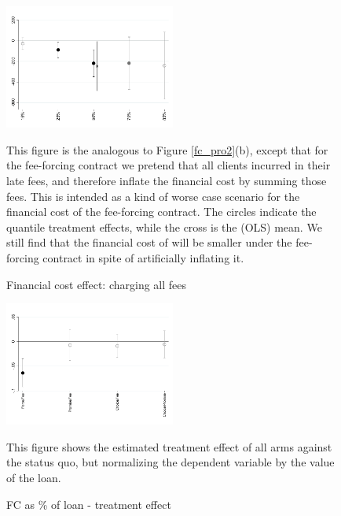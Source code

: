 \documentclass[oneside,11pt]{article}
\begin{document}
\begin{figure}[H]
        \caption{Financial cost effect: charging all fees}
    \label{fc_allfee}
    \begin{center}
        \centering
        \includegraphics[width=0.50\textwidth]{Figuras/fc_allfee_quantile_pro_2.pdf}
    \end{center}
    \scriptsize
     This figure is the analogous to Figure \ref{fc_pro2}(b), except that for the fee-forcing contract we pretend that all clients incurred in their late fees, and therefore inflate the financial cost by summing those fees. This is intended as a kind of worse case scenario for the financial cost of the fee-forcing contract. The circles indicate the quantile treatment effects, while the cross is the (OLS) mean. We still find that the financial cost of will be smaller under the fee-forcing contract in spite of artificially inflating it.
\end{figure}





\begin{figure}[H]
        \caption{FC as \% of loan - treatment effect}
    \label{fc_perc}
    \begin{center}
        \centering
        \includegraphics[width=0.50\textwidth]{Figuras/fc_perc_te_allarms.pdf}
    \end{center}
     \scriptsize This figure shows the estimated treatment effect of all arms against the status quo, but normalizing the dependent variable by the value of the loan.
\end{figure}
\end{document}
